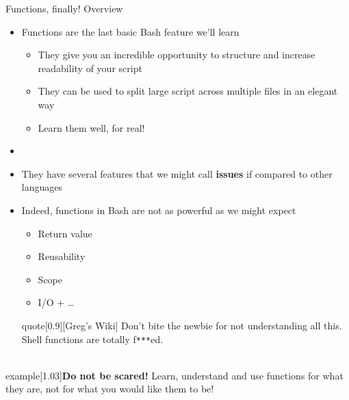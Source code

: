 
\begin{frame}{Functions, finally! Overview}
    \vspace{-2mm}
    \begin{itemize}
        \item Functions are the last basic Bash feature we'll learn
              \begin{itemize}
                  \item They give you an incredible opportunity to structure and increase readability of your script
                  \item They can be used to split large script across multiple files in an elegant way
                  \item \alert{Learn them well, for real!}
              \end{itemize}
        \item {}
        \item They have several features that we might call \textbf{issues} if compared to other languages
        \item[\PT{$\bullet$}] Indeed, functions in Bash are not as powerful as we might expect
              \begin{itemize}
                  \item[\PT{$\to$}] Return value
                  \item[\PT{$\to$}] Reusability
                  \item[\PT{$\to$}] Scope
                  \item[\PT{$\to$}] I/O + \ldots
              \end{itemize}
              \begin{varblock}{quote}[0.9\textwidth]{}[Greg's Wiki]
                  Don't bite the newbie for not understanding all this. Shell functions are totally f\texttt{***}ed. \\[-1.3ex] ~
              \end{varblock}
    \end{itemize}
    \vspace{-4mm}
    \begin{varblock}{example}[1.03\textwidth]{\textbf{Do not be scared!}}
        Learn, understand and use functions for what they are, not for what you would like them to be!
    \end{varblock}
\end{frame}
